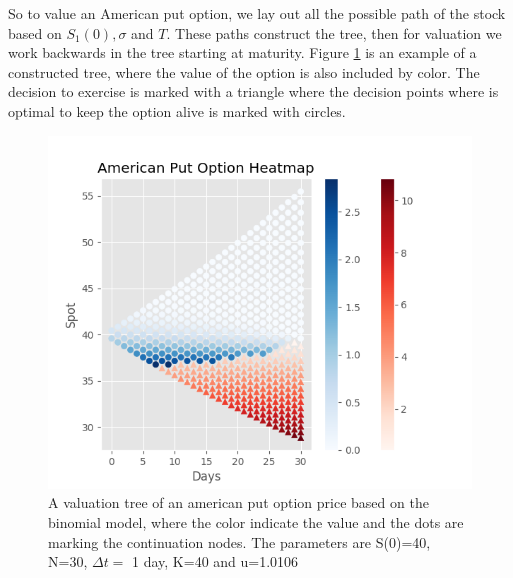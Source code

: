 So to value an American put option, we lay out all the possible path of the stock based on $S_1(0),\sigma$ and $T$. These paths construct the tree, then for valuation we work backwards in the tree starting at maturity. Figure \ref{fig:BinomialTree} is an example of a constructed tree, where the value of the option is also included by color. The decision to exercise is marked with a triangle where the decision points where is optimal to keep the option alive is marked with circles. \\

\begin{figure}[th]
\centering
\includegraphics{Figures/BinomialTree.png}
\decoRule
\caption[Binomial Tree]{A valuation tree of an american put option price based on the binomial model, where the color indicate the value and the dots are marking the continuation nodes. The parameters are S(0)=40, N=30, $\Delta t =$ 1 day, K=40 and u=1.0106}
\label{fig:BinomialTree}
\end{figure}

